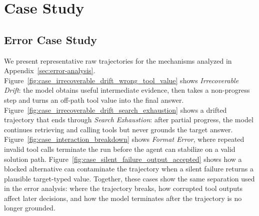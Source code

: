 
\section{Case Study}
\label{app:case-study}



\subsection{Error Case Study}

We present representative raw trajectories for the mechanisms analyzed in Appendix~\ref{sec:error-analysis}. 
Figure~\ref{fig:case_irrecoverable_drift_wrong_tool_value} shows \textit{Irrecoverable Drift}: the model obtains useful intermediate evidence, then takes a non-progress step and turns an off-path tool value into the final answer. 
Figure~\ref{fig:case_irrecoverable_drift_search_exhaustion} shows a drifted trajectory that ends through \emph{Search Exhaustion}: after partial progress, the model continues retrieving and calling tools but never grounds the target answer. 
Figure~\ref{fig:case_interaction_breakdown} shows \textit{Format Error}, where repeated invalid tool calls terminate the run before the agent can stabilize on a valid solution path. 
Figure~\ref{fig:case_silent_failure_output_accepted} shows how a blocked alternative can contaminate the trajectory when a silent failure returns a plausible target-typed value. 
Together, these cases show the same separation used in the error analysis: where the trajectory breaks, how corrupted tool outputs affect later decisions, and how the model terminates after the trajectory is no longer grounded.


